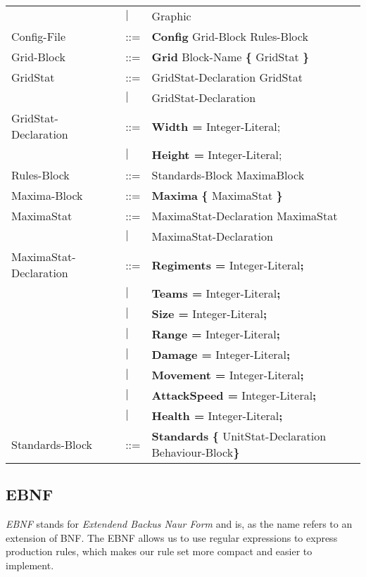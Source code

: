 \begin{center}
\begin{longtable}{l l l}
									&$\mid$	&Graphic\\
		Config-File					&	::=	&{\bf Config} Grid-Block Rules-Block\\
		Grid-Block					&	::=	&{\bf Grid} Block-Name	 {\bf \{} GridStat \bf{\}}\\
		GridStat					&	::=	&GridStat-Declaration GridStat\\
									&$\mid$	&GridStat-Declaration \\
		GridStat-Declaration		&	::=	&{\bf Width = } Integer-Literal;\\
									&$\mid$	&{\bf Height = } Integer-Literal;\\
		Rules-Block					&	::=	&Standards-Block MaximaBlock\\
		Maxima-Block				&	::=	&{\bf Maxima} {\bf \{} MaximaStat {\bf \}} \\
		MaximaStat				&	::=		&MaximaStat-Declaration MaximaStat\\
									&$\mid$	&MaximaStat-Declaration\\
		MaximaStat-Declaration	&	::=	&{\bf Regiments = } Integer-Literal{\bf ;}\\
									&$\mid$	&{\bf Teams = } Integer-Literal{\bf ;}\\
									&$\mid$	&{\bf Size = } Integer-Literal{\bf ;}\\
									&$\mid$	&{\bf Range = } Integer-Literal{\bf ;}\\
									&$\mid$	&{\bf Damage = } Integer-Literal{\bf ;}\\
									&$\mid$	&{\bf Movement = } Integer-Literal{\bf ;}\\
									&$\mid$	&{\bf AttackSpeed = } Integer-Literal{\bf ;}\\
									&$\mid$	&{\bf Health = } Integer-Literal{\bf ;}\\
		Standards-Block				&	::=	&{\bf Standards} {\bf \{ } UnitStat-Declaration Behaviour-Block\bf{\} }\\
		\end{longtable}
		\end{center}
		
	\subsection{EBNF}
		{\it EBNF} stands for {\it Extendend Backus Naur Form} and is, as the name refers to an extension of BNF.
		The EBNF allows us to use regular expressions to express production rules, which makes our rule set more compact and 
		easier to implement.
	
